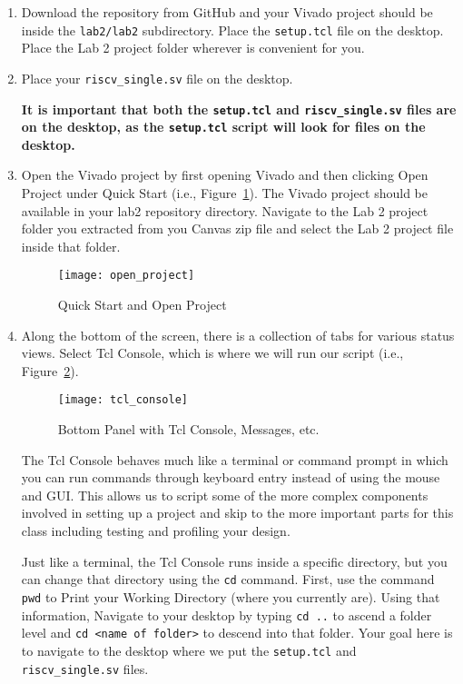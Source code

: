 \documentclass{article}
\begin{document}
\begin{enumerate}
\item Download the repository from GitHub and your Vivado project
  should be inside the \verb|lab2/lab2| subdirectory.  Place the
  \verb|setup.tcl| file on the desktop.  Place the Lab 2 project folder wherever
is convenient for you.

\item Place your \verb|riscv_single.sv| file on the desktop.

\textbf{It is important that both the \texttt{setup.tcl} and
\texttt{riscv\_single.sv} files are on the desktop, as the \texttt{setup.tcl}
script will look for files on the desktop.}

\item Open the Vivado project by first opening Vivado and then clicking Open
  Project under Quick Start (i.e., Figure~\ref{fig:openproject}).
  The Vivado project should be available in your lab2 repository directory.
  Navigate to the Lab 2 project folder
  you extracted from you Canvas zip file and select the Lab 2 project file inside
that folder.
\begin{figure}[h!]
  \centering
  \texttt{[image: open\_project]}
  \caption{Quick Start and Open Project}
  \label{fig:openproject}
\end{figure}

\item Along the bottom of the screen, there is a collection of tabs for various
status views.  Select Tcl Console, which is where we will run our
script (i.e., Figure~\ref{fig:tclconsole}).
\begin{figure}[h!]
  \centering
  \texttt{[image: tcl\_console]}
  \caption{Bottom Panel with Tcl Console, Messages, etc.}
  \label{fig:tclconsole}
\end{figure}

The Tcl Console behaves much like a terminal or command prompt in which you can
run commands through keyboard entry instead of using the mouse and GUI.  This
allows us to script some of the more complex components involved in setting up
a project and skip to the more important parts for this class including testing
and profiling your design.

Just like a terminal, the Tcl Console runs inside a specific directory, but you
can change that directory using the \verb|cd| command.  First, use the command
\verb|pwd| to Print your Working Directory (where you currently are).  Using
that information, Navigate to your desktop by typing \verb|cd ..| to
ascend a folder level and \verb|cd <name of folder>| to descend into that
folder.  Your goal here is to navigate to the desktop where we put the
\verb|setup.tcl| and \verb|riscv_single.sv| files.


\end{enumerate}
\end{document}
